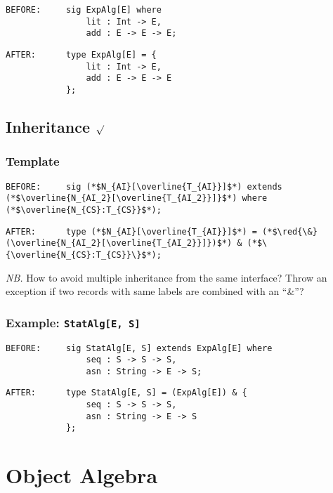 \documentclass{article}
\newcommand{\red}[1]{\textcolor{red}{#1}}
\newcommand{\nb}{\textit{NB. }}
\begin{document}
\begin{spacing}{1.1}
\begin{lstlisting}[numbers=none]
BEFORE:     sig ExpAlg[E] where
                lit : Int -> E,
                add : E -> E -> E;
\end{lstlisting}
\begin{lstlisting}[numbers=none]
AFTER:      type ExpAlg[E] = {
                lit : Int -> E,
                add : E -> E -> E
            };
\end{lstlisting}

\subsection{Inheritance $\surd$}

\subsubsection{Template}

\begin{lstlisting}[numbers=none]
BEFORE:     sig (*$N_{AI}[\overline{T_{AI}}]$*) extends (*$\overline{N_{AI_2}[\overline{T_{AI_2}}]}$*) where (*$\overline{N_{CS}:T_{CS}}$*);
\end{lstlisting}
\begin{lstlisting}[numbers=none]
AFTER:      type (*$N_{AI}[\overline{T_{AI}}]$*) = (*$\red{\&}(\overline{N_{AI_2}[\overline{T_{AI_2}}]})$*) & (*$\{\overline{N_{CS}:T_{CS}}\}$*);
\end{lstlisting}

\nb How to avoid multiple inheritance from the same interface? Throw an exception if two records with same labels are combined with an ``\&''?

\subsubsection{Example: \lstinline{StatAlg[E, S]}}

\begin{lstlisting}[numbers=none]
BEFORE:     sig StatAlg[E, S] extends ExpAlg[E] where
                seq : S -> S -> S,
                asn : String -> E -> S;
\end{lstlisting}
\begin{lstlisting}[numbers=none]
AFTER:      type StatAlg[E, S] = (ExpAlg[E]) & {
                seq : S -> S -> S,
                asn : String -> E -> S
            };
\end{lstlisting}

\section{Object Algebra}


\end{spacing}
\end{document}
